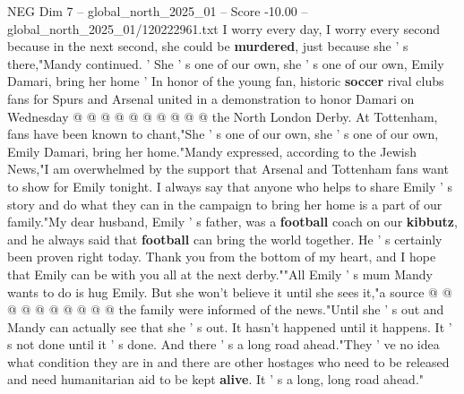 \begin{textsample}{NEG Dim 7 – global\_north\_2025\_01 – Score -10.00 – global\_north\_2025\_01/120222961.txt}
I worry every day, I worry every second because in the next second, she could be \textbf{murdered}, just because she ' s there,"Mandy continued. ' She ' s one of our own, she ' s one of our own, Emily Damari, bring her home ' In honor of the young fan, historic \textbf{soccer} rival clubs fans for Spurs and Arsenal united in a demonstration to honor Damari on Wednesday @ @ @ @ @ @ @ @ @ @ the North London Derby.
At Tottenham, fans have been known to chant,"She ' s one of our own, she ' s one of our own, Emily Damari, bring her home."Mandy expressed, according to the Jewish News,"I am overwhelmed by the support that Arsenal and Tottenham fans want to show for Emily tonight.
I always say that anyone who helps to share Emily ' s story and do what they can in the campaign to bring her home is a part of our family."My dear husband, Emily ' s father, was a \textbf{football} coach on our \textbf{kibbutz}, and he always said that \textbf{football} can bring the world together.
He ' s certainly been proven right today.
Thank you from the bottom of my heart, and I hope that Emily can be with you all at the next derby.""All Emily ' s mum Mandy wants to do is hug Emily.
But she won't believe it until she sees it,"a source @ @ @ @ @ @ @ @ @ @ the family were informed of the news."Until she ' s out and Mandy can actually see that she ' s out.
It hasn't happened until it happens.
It ' s not done until it ' s done.
And there ' s a long road ahead."They ' ve no idea what condition they are in and there are other hostages who need to be released and need humanitarian aid to be kept \textbf{alive}.
It ' s a long, long road ahead."

\end{textsample}
